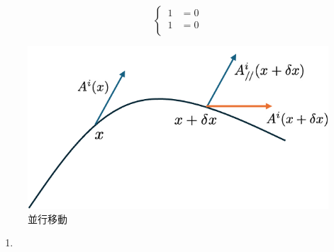 \documentclass[dvipdfmx]{report} %
\begin{document}
\begin{equation}
\left\{ \,
\begin{aligned}
	1 &= 0\\
	1 &= 0\\
\end{aligned}
\right.
\end{equation}

\begin{figure}[H]
    \centering
    \includegraphics[width=0.5\columnwidth]{./images/0106/01.png}
    \caption{並行移動}
    \label{}
\end{figure}

\begin{enumerate}[(1)\,]
\item{}
\end{enumerate}
\end{document}

